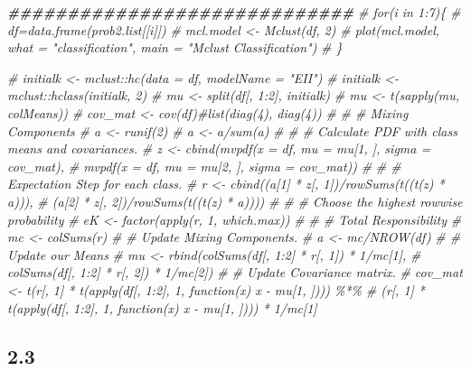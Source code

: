 \documentclass[
  11pt,
]{article}
\newenvironment{Shaded}{\begin{snugshade}}{\end{snugshade}}
\newcommand{\CommentTok}[1]{\textcolor[rgb]{0.56,0.35,0.01}{\textit{#1}}}
\newcommand{\DocumentationTok}[1]{\textcolor[rgb]{0.56,0.35,0.01}{\textbf{\textit{#1}}}}
\begin{document}
\begin{Shaded}
\begin{Highlighting}[]
\DocumentationTok{\#\#\#\#\#\#\#\#\#\#\#\#\#\#\#\#\#\#\#\#\#\#\#\#\#\#\#\#\#}
\CommentTok{\# for(i in 1:7)\{}
\CommentTok{\#   df=data.frame(prob2.list[[i]])}
\CommentTok{\#   mcl.model \textless{}{-} Mclust(df, 2)}
\CommentTok{\#   plot(mcl.model, what = "classification", main = "Mclust Classification")}
\CommentTok{\# \}}


\CommentTok{\# initialk \textless{}{-} mclust::hc(data = df, modelName = "EII")}
\CommentTok{\# initialk \textless{}{-} mclust::hclass(initialk, 2)}
\CommentTok{\# mu \textless{}{-} split(df[, 1:2], initialk)}
\CommentTok{\# mu \textless{}{-} t(sapply(mu, colMeans))}
\CommentTok{\# cov\_mat \textless{}{-} cov(df)\#list(diag(4), diag(4))}
\CommentTok{\# }
\CommentTok{\# \# Mixing Components}
\CommentTok{\# a \textless{}{-} runif(2)}
\CommentTok{\# a \textless{}{-} a/sum(a)}
\CommentTok{\# }
\CommentTok{\# \# Calculate PDF with class means and covariances.}
\CommentTok{\# z \textless{}{-} cbind(mvpdf(x = df, mu = mu[1, ], sigma = cov\_mat), }
\CommentTok{\#            mvpdf(x = df, mu = mu[2, ], sigma = cov\_mat))}
\CommentTok{\# }
\CommentTok{\# \# Expectation Step for each class.}
\CommentTok{\# r \textless{}{-} cbind((a[1] * z[, 1])/rowSums(t((t(z) * a))), }
\CommentTok{\#            (a[2] * z[, 2])/rowSums(t((t(z) * a))))}
\CommentTok{\# }
\CommentTok{\# \# Choose the highest rowwise probability}
\CommentTok{\# eK \textless{}{-} factor(apply(r, 1, which.max))}
\CommentTok{\# }
\CommentTok{\# \# Total Responsibility}
\CommentTok{\# mc \textless{}{-} colSums(r)}
\CommentTok{\# \# Update Mixing Components.}
\CommentTok{\# a \textless{}{-} mc/NROW(df)}
\CommentTok{\# \# Update our Means}
\CommentTok{\# mu \textless{}{-} rbind(colSums(df[, 1:2] * r[, 1]) * 1/mc[1], }
\CommentTok{\#             colSums(df[, 1:2] * r[, 2]) * 1/mc[2])}
\CommentTok{\# \# Update Covariance matrix.}
\CommentTok{\# cov\_mat \textless{}{-} t(r[, 1] * t(apply(df[, 1:2], 1, function(x) x {-} mu[1, ]))) \%*\% }
\CommentTok{\#     (r[, 1] * t(apply(df[, 1:2], 1, function(x) x {-} mu[1, ]))) * 1/mc[1]}
\end{Highlighting}
\end{Shaded}

\hypertarget{section-8}{%
\subsection{2.3}\label{section-8}}
\end{document}
